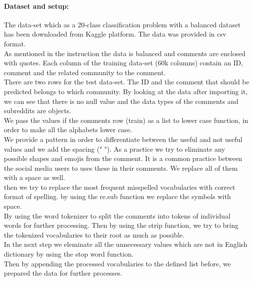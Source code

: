 \documentclass[12pt]{report}
\begin{document}
	\paragraph{Dataset and setup:}
	The data-set which as a 20-class classification problem with a balanced
	dataset has been downloaded from Kaggle platform. The data was provided in csv format.\\
	As mentioned in the instruction the data is balanced and comments are enclosed with quotes.
	Each column of the training data-set (60k columns) contain an ID, comment and the related community to the comment.\\
	There are two rows for the test data-set. The ID and the comment that should be predicted belongs to which community.
	By looking at the data after importing it, we can see that there is no null value and the data types of the comments and subreddits are objects. \\
	We pass the values if the comments row (train) as a list to lower case function, in order to make all the alphabets lower case.\\
	We provide a pattern in order to differentiate between the useful and not useful values and we add the spacing (" ").
	As a practice we try to eliminate any possible shapes and emojis from the comment. It is a common practice between the social media users to uses these in their comments. We replace all of them with a space as well.\\
	then we try to replace the most frequent misspelled vocabularies with correct format of spelling. by using the re.sub function we replace the symbols with space.\\
	By using the word tokenizer to split the comments into tokens of individual words for further processing. Then by using the strip function, we try to bring the tokenized vocabularies to their root as much as possible.\\
	In the next step we eleminate all the unnecessary values which are not in English dictionary by using the stop word function. \\
	Then by appending the processed vocabularies to the defined list before, we prepared the data for further processes. \\
	
	
	
\end{document}
